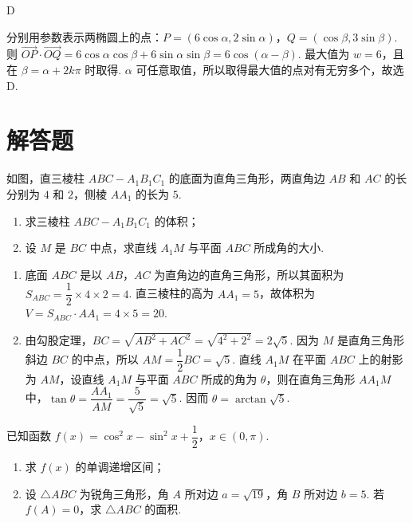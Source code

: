 \begin{answer}
D
\end{answer}

\begin{solution}
分别用参数表示两椭圆上的点：\(P=(6\cos\alpha,2\sin\alpha)\)，\(Q=(\cos\beta,3\sin\beta)\). 则 \(\overrightarrow{OP}\cdot\overrightarrow{OQ}=6\cos\alpha\cos\beta+6\sin\alpha\sin\beta=6\cos(\alpha-\beta)\). 最大值为 \(w=6\)，且在 \(\beta=\alpha+2k\pi\) 时取得. \(\alpha\) 可任意取值，所以取得最大值的点对有无穷多个，故选 D.
\end{solution}

\section{解答题}

\begin{problem}
如图，直三棱柱 \(ABC-A_1B_1C_1\) 的底面为直角三角形，两直角边 \(AB\) 和 \(AC\) 的长分别为 \(4\) 和 \(2\)，侧棱 \(AA_1\) 的长为 \(5\).

\begin{enumerate}
\item 求三棱柱 \(ABC-A_1B_1C_1\) 的体积；
\item 设 \(M\) 是 \(BC\) 中点，求直线 \(A_1M\) 与平面 \(ABC\) 所成角的大小.
\end{enumerate}

\end{problem}

\begin{solution}
\begin{enumerate}
\item 底面 \(ABC\) 是以 \(AB\)，\(AC\) 为直角边的直角三角形，所以其面积为 \(S_{ABC}=\dfrac12\times4\times2=4\). 直三棱柱的高为 \(AA_1=5\)，故体积为 \(V=S_{ABC}\cdot AA_1=4\times5=20\).
\item 由勾股定理，\(BC=\sqrt{AB^2+AC^2}=\sqrt{4^2+2^2}=2\sqrt5\). 因为 \(M\) 是直角三角形斜边 \(BC\) 的中点，所以 \(AM=\dfrac12BC=\sqrt5\). 直线 \(A_1M\) 在平面 \(ABC\) 上的射影为 \(AM\)，设直线 \(A_1M\) 与平面 \(ABC\) 所成的角为 \(\theta\)，则在直角三角形 \(AA_1M\) 中，\(\tan\theta=\dfrac{AA_1}{AM}=\dfrac5{\sqrt5}=\sqrt5\). 因而 \(\theta=\arctan\sqrt5\).
\end{enumerate}
\end{solution}

\begin{problem}
已知函数 \(f(x)=\cos^2x-\sin^2x+\dfrac12\)，\(x\in(0,\pi)\).
\begin{enumerate}
\item 求 \(f(x)\) 的单调递增区间；
\item 设 \(\triangle ABC\) 为锐角三角形，角 \(A\) 所对边 \(a=\sqrt{19}\)，角 \(B\) 所对边 \(b=5\). 若 \(f(A)=0\)，求 \(\triangle ABC\) 的面积.
\end{enumerate}
\end{problem}

